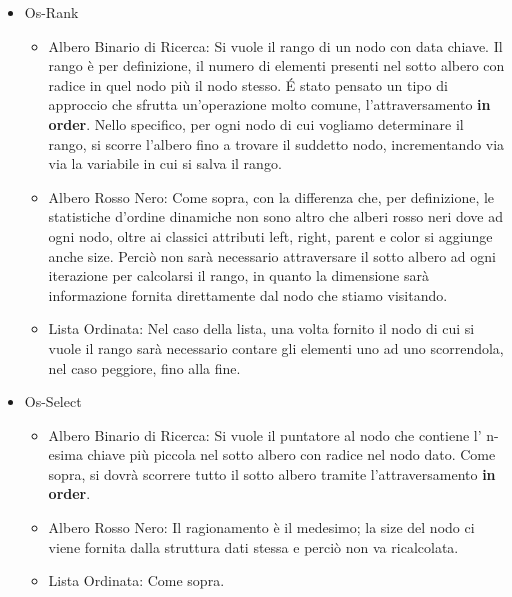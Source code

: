 \begin{itemize}
\item Os-Rank
    \begin{itemize}
        \item Albero Binario di Ricerca: Si vuole il rango di un nodo con data chiave. Il rango è per definizione, il numero di elementi presenti nel sotto albero con radice in quel nodo più il nodo stesso. É stato pensato un tipo di approccio che sfrutta un'operazione molto comune, l'attraversamento \textbf{in order}. Nello specifico, per ogni nodo di cui vogliamo determinare il rango, si scorre l'albero fino a trovare il suddetto nodo, incrementando via via la variabile in cui si salva il rango.
        \item Albero Rosso Nero: Come sopra, con la differenza che, per definizione, le statistiche d'ordine dinamiche non sono altro che alberi rosso neri dove ad ogni nodo, oltre ai classici attributi left, right, parent e color si aggiunge anche size. Perciò non sarà necessario attraversare il sotto albero ad ogni iterazione per calcolarsi il rango, in quanto la dimensione sarà informazione fornita direttamente dal nodo che stiamo visitando.
        \item Lista Ordinata: Nel caso della lista, una volta fornito il nodo di cui si vuole il rango sarà necessario contare gli elementi uno ad uno scorrendola, nel caso peggiore, fino alla fine.
    \end{itemize}
\item Os-Select
    \begin{itemize}
        \item Albero Binario di Ricerca: Si vuole il puntatore al nodo che contiene l' n-esima chiave più piccola nel sotto albero con radice nel nodo dato. Come sopra, si dovrà scorrere tutto il sotto albero tramite l'attraversamento \textbf{in order}.
        \item Albero Rosso Nero: Il ragionamento è il medesimo; la size del nodo ci viene fornita dalla struttura dati stessa e perciò non va ricalcolata.
        \item Lista Ordinata: Come sopra.
    \end{itemize}
\end{itemize}

\vspace{0.8cm}

